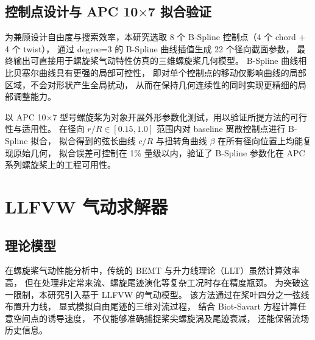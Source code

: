 \subsection{控制点设计与 APC 10$\times$7 拟合验证}

为兼顾设计自由度与搜索效率，本研究选取 8 个 B-Spline 控制点（4 个 chord + 4 个 twist），
通过 degree=3 的 B-Spline 曲线插值生成 22 个径向截面参数，
最终输出可直接用于螺旋桨气动特性仿真的三维螺旋桨几何模型。
B-Spline 曲线相比贝塞尔曲线具有更强的局部可控性，
即对单个控制点的移动仅影响曲线的局部区域，不会对形状产生全局扰动，
从而在保持几何连续性的同时实现更精细的局部调整能力。

以 APC 10$\times$7 型号螺旋桨为对象开展外形参数化测试，用以验证所提方法的可行性与适用性。
在径向 $r/R \in [0.15, 1.0]$ 范围内对 baseline 离散控制点进行 B-Spline 拟合，
拟合得到的弦长曲线 $c/R$ 与扭转角曲线 $\beta$ 在所有径向位置上均能复现原始几何，
拟合误差可控制在 1\% 量级以内，验证了 B-Spline 参数化在 APC 系列螺旋桨上的工程可用性。

\section{LLFVW 气动求解器}

\subsection{理论模型}

在螺旋桨气动性能分析中，传统的 BEMT 与升力线理论（LLT）虽然计算效率高，
但在处理非定常来流、螺旋尾迹演化等复杂工况时存在精度瓶颈。
为突破这一限制，本研究引入基于 LLFVW 的气动模型。
该方法通过在桨叶四分之一弦线布置升力线，
显式模拟自由尾迹的三维对流过程，
结合 Biot-Savart 方程计算任意空间点的诱导速度，
不仅能够准确捕捉桨尖螺旋涡及尾迹衰减，
还能保留流场历史信息。

